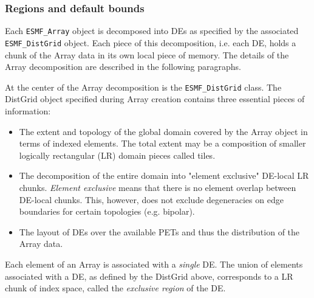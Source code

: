   
   \subsubsection{Regions and default bounds}
   \label{Array_regions_and_default_bounds}
  
   Each {\tt ESMF\_Array} object is decomposed into DEs as specified by the
   associated {\tt ESMF\_DistGrid} object. Each piece of this decomposition, i.e.
   each DE, holds a chunk of the Array data in its own local piece of memory.
   The details of the Array decomposition are described in the following 
   paragraphs.
  
   At the center of the Array decomposition is the {\tt ESMF\_DistGrid} class.
   The DistGrid object specified during Array creation contains three essential
   pieces of information:
   \begin{itemize}
   \item The extent and topology of the global domain covered by the Array object
         in terms of indexed elements. The total extent may be a composition of
         smaller logically rectangular (LR) domain pieces called tiles.
   \item The decomposition of the entire domain into "element exclusive" DE-local
         LR chunks. {\em Element exclusive} means that there is no element overlap
         between DE-local chunks. This, however, does not exclude degeneracies 
         on edge boundaries for certain topologies (e.g. bipolar).
   \item The layout of DEs over the available PETs and thus the distribution of
         the Array data.
   \end{itemize}
  
   Each element of an Array is associated with a {\em single} DE. The union of
   elements associated with a DE, as defined by the DistGrid above, corresponds
   to a LR chunk of index space, called the {\em exclusive region} of the DE.
  
